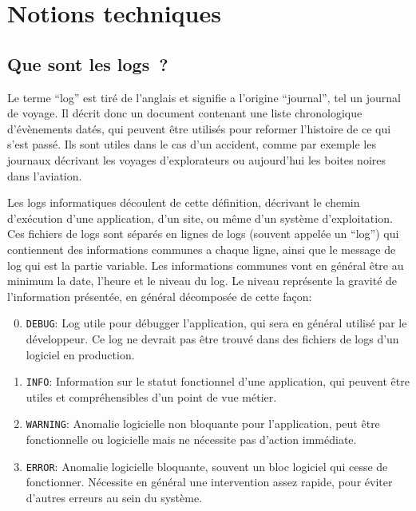 \documentclass[openany, 11pt]{memoir}
\begin{document}

\newpage
\chapter{Notions techniques}

\section{Que sont les logs~?}
\label{logs}

Le terme ``log'' est tiré de l'anglais et signifie a l'origine ``journal'', tel un journal de voyage. Il décrit donc un document contenant une liste chronologique d'évènements datés, qui peuvent être utilisés pour reformer l'histoire de ce qui s'est passé. Ils sont utiles dans le cas d'un accident, comme par exemple les journaux décrivant les voyages d'explorateurs ou aujourd'hui les boites noires dans l'aviation.

Les logs informatiques découlent de cette définition, décrivant le chemin d'exécution d'une application, d'un site, ou même d'un système d'exploitation. Ces fichiers de logs sont séparés en lignes de logs (souvent appelée un ``log'') qui contiennent des informations communes a chaque ligne, ainsi que le message de log qui est la partie variable. Les informations communes vont en général être au minimum la date, l'heure et le niveau du log. Le niveau représente la gravité de l'information présentée, en général décomposée de cette façon:

\begin{enumerate}
	\setcounter{enumi}{-1}
	\item \texttt{DEBUG}: Log utile pour débugger l'application, qui sera en général utilisé par le développeur. Ce log ne devrait pas être trouvé dans des fichiers de logs d'un logiciel en production.
	\item \texttt{INFO}: Information sur le statut fonctionnel d'une application, qui peuvent être utiles et compréhensibles d'un point de vue métier.
	\item \texttt{WARNING}: Anomalie logicielle non bloquante pour l'application, peut être fonctionnelle ou logicielle mais ne nécessite pas d'action immédiate.
	\item \texttt{ERROR}: Anomalie logicielle bloquante, souvent un bloc logiciel qui cesse de fonctionner. Nécessite en général une intervention assez rapide, pour éviter d'autres erreurs au sein du système.
\end{enumerate}
\end{document}
